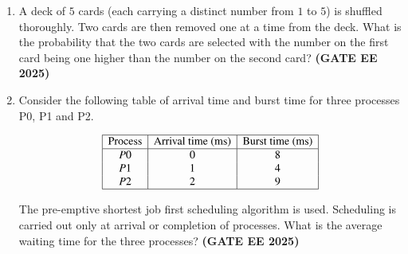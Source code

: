 \documentclass[journal,12pt,onecolumn]{IEEEtran}
\theoremstyle{remark}
\begin{document}
\begin{enumerate}
\item A deck of $5$ cards (each carrying a distinct number from $1$ to $5$) is shuffled thoroughly. Two cards are then removed one at a time from the deck. What is the probability that the two cards are selected with the number on the first card being one higher than the number on the second card?
\hfill \textbf{(GATE EE 2025)}
\begin{enumerate}
\end{enumerate}


\item Consider the following table of arrival time and burst time for three processes P0, P1 and P2.

\[
\begin{array}{|c|c|c|}
\hline
\text{Process} & \text{Arrival time (ms)} & \text{Burst time (ms)} \\
\hline
P0 & 0 & 8 \\
P1 & 1 & 4 \\
P2 & 2 & 9 \\
\hline
\end{array}
\]

The pre-emptive shortest job first scheduling algorithm is used. Scheduling is carried out only at arrival or completion of processes. What is the average waiting time for the three processes?
\hfill \textbf{(GATE EE 2025)}
\begin{enumerate}
\end{enumerate}



\end{enumerate}
\end{document}
